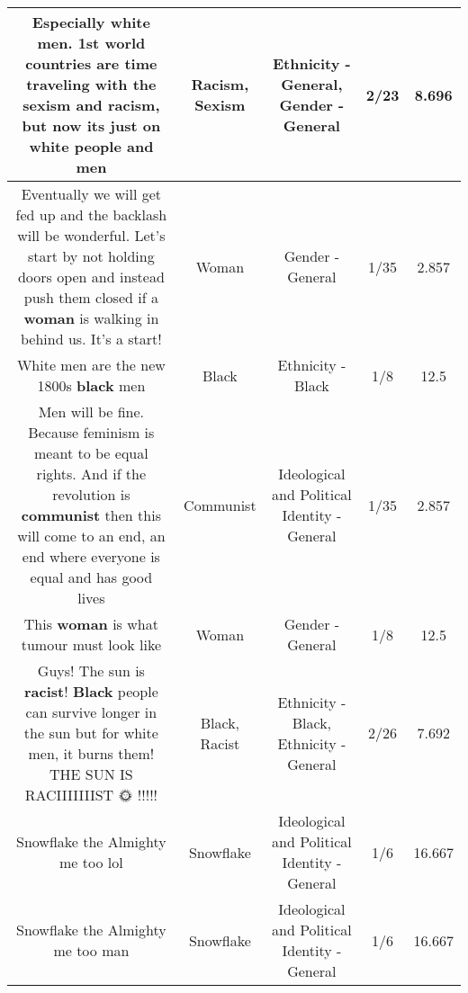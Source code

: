 \documentclass[11pt]{article}
\newlength\mylength
\begin{document}
\begin{center}
\begin{longtable}{|C{.65\mylength}|C{.30\mylength}|C{.12\mylength}|C{.12\mylength}|C{.12\mylength}|}
  \small Especially white men. 1st world countries are time traveling with the \textbf{sexism} and \textbf{racism}, but now its just on white people and men\normalsize   & Racism, Sexism & Ethnicity - General, Gender - General & 2/23 & 8.696 \\  \hline
  \small Eventually we will get fed up and the backlash will be wonderful. Let's start by not holding doors open and instead push them closed if a \textbf{woman} is walking in behind us.  It's a start!\normalsize   & Woman & Gender - General & 1/35 & 2.857 \\  \hline
  \small White men are the new 1800s \textbf{black} men\normalsize   & Black & Ethnicity - Black & 1/8 & 12.5 \\  \hline
  \small Men will be fine. Because feminism is meant to be equal rights. And if the revolution is \textbf{communist} then this will come to an end, an end where everyone is equal and has good lives\normalsize   & Communist &  Ideological and Political Identity - General & 1/35 & 2.857 \\  \hline
  \small This \textbf{woman} is what tumour must look like\normalsize   & Woman & Gender - General & 1/8 & 12.5 \\  \hline
  \small Guys! The sun is \textbf{racist}! \textbf{Black} people can survive longer in the sun but for white men, it burns them! THE SUN IS RACIIIIIIIST 🌞 !!!!!\normalsize   & Black, Racist & Ethnicity - Black, Ethnicity - General & 2/26 & 7.692 \\  \hline
  \small Snowflake the Almighty me too lol\normalsize   & Snowflake &  Ideological and Political Identity - General & 1/6 & 16.667 \\  \hline
  \small Snowflake the Almighty me too man\normalsize   & Snowflake &  Ideological and Political Identity - General & 1/6 & 16.667 \\  \hline

\end{longtable}
\end{center}
\end{document}

